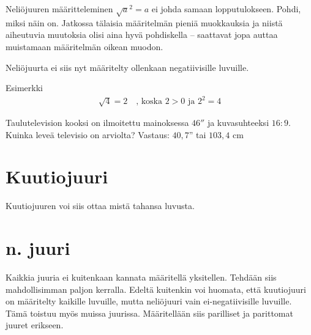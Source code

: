 \begin{esimerkki}

Neliöjuuren määritteleminen $\sqrt{a}^2=a$ ei johda samaan lopputulokseen. Pohdi, miksi näin on.
Jatkossa tälaisia määritelmän pieniä muokkauksia ja niistä aiheutuvia muutoksia olisi aina hyvä pohdiskella -- saattavat jopa auttaa muistamaan määritelmän oikean muodon.

Neliöjuurta ei siis nyt määritelty ollenkaan negatiivisille luvuille.


Esimerkki
\begin{align*}
\sqrt{4} = 2\quad \textrm{, koska $2>0$ ja $2^2 =4$} 
\end{align*}

Taulutelevision kooksi on ilmoitettu mainoksessa $46''$ ja kuvasuhteeksi $16:9$. Kuinka leveä televisio on arviolta?
Vastaus: $40,7$'' tai $103,4$ cm

\section{Kuutiojuuri}

Kuutiojuuren voi siis ottaa mistä tahansa luvusta.

\section{n. juuri}
Kaikkia juuria ei kuitenkaan kannata määritellä yksitellen. Tehdään siis mahdollisimman paljon kerralla. Edeltä kuitenkin voi huomata, että kuutiojuuri on määritelty kaikille luvuille, mutta neliöjuuri vain ei-negatiivisille luvuille. Tämä toistuu myös muissa juurissa. Määritellään siis parilliset ja parittomat juuret erikseen.


\end{esimerkki}
